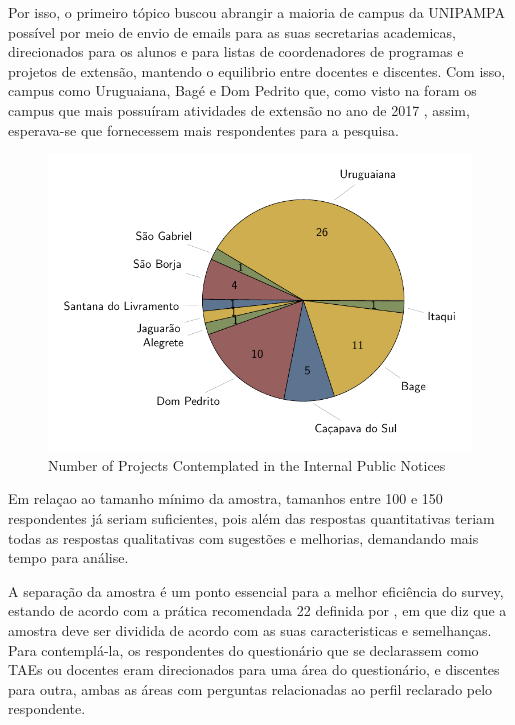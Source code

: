 Por isso, o primeiro tópico buscou abrangir a maioria de campus da \ac{UNIPAMPA} possível por meio de envio de emails para as suas secretarias academicas, direcionados para os alunos e para listas de coordenadores de programas e projetos de extensão, mantendo o equilibrio entre docentes e discentes. 
Com isso, campus como Uruguaiana, Bagé e Dom Pedrito que, como visto na  foram os campus que mais possuíram atividades de extensão no ano de 2017 \cite{relatorio-2017}, assim, esperava-se que fornecessem mais respondentes para a pesquisa.
\begin{figure}[htb]
  \caption{Number of Projects Contemplated in the Internal Public Notices}\label{fig:number-of-projects}
  \begin{center}
    \includegraphics[width=16cm]{img/uruguaiana.pdf}
  \end{center}
\end{figure}

Em relaçao ao tamanho mínimo da amostra, tamanhos entre 100 e 150 respondentes já seriam suficientes, pois além das respostas quantitativas teriam todas as respostas qualitativas com sugestões e melhorias, demandando mais tempo para análise.

A separação da amostra é um ponto essencial para a melhor eficiência do survey, estando de acordo com a prática recomendada 22 definida por , em que diz que a amostra deve ser dividida de acordo com as suas caracteristicas e semelhanças. 
Para contemplá-la, os respondentes do questionário que se declarassem como \acp{TAE} ou docentes eram direcionados para uma área do questionário, e discentes para outra, ambas as áreas com perguntas relacionadas ao perfil reclarado pelo respondente.

